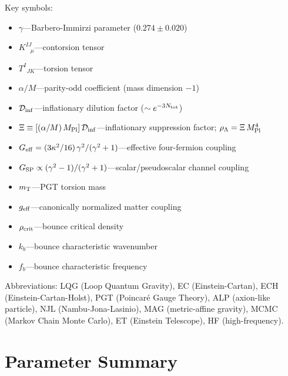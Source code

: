 \documentclass[aps,prd,twocolumn,superscriptaddress,showpacs,preprintnumbers,
  nofootinbib,longbibliography,floatfix]{revtex4-2}
\newcommand{\Dinf}{\mathcal{D}_{\rm inf}}
\newcommand{\rhocrit}{\rho_{\rm crit}}
\newcommand{\MPl}{M_{\rm Pl}}
\newcommand{\BI}{\gamma}
\newcommand{\Geff}{G_{\rm eff}}
\newcommand{\Gsp}{G_{\rm SP}}
\newcommand{\mT}{m_{\rm T}}
\newcommand{\geff}{g_{\rm eff}}
\begin{document}
Key symbols:
\begin{itemize}[leftmargin=*]
\item $\BI$---Barbero-Immirzi parameter ($0.274 \pm 0.020$)
\item $K^{IJ}_{\;\;\;\mu}$---contorsion tensor
\item $T^I_{\;\;JK}$---torsion tensor
\item $\alpha/M$---parity-odd coefficient (mass dimension $-1$)
\item $\Dinf$---inflationary dilution factor ($\sim e^{-3N_{\rm tot}}$)
\item $\Xi\equiv[(\alpha/M)\,\MPl]\,\Dinf$---inflationary suppression
  factor; $\rho_\Lambda = \Xi\,\MPl^4$
\item $\Geff = (3\kappa^2/16)\,\BI^2/(\BI^2+1)$---effective four-fermion
  coupling
\item $\Gsp \propto (\BI^2-1)/(\BI^2+1)$---scalar/pseudoscalar channel
  coupling
\item $\mT$---PGT torsion mass
\item $\geff$---canonically normalized matter coupling
\item $\rhocrit$---bounce critical density
\item $k_b$---bounce characteristic wavenumber
\item $f_b$---bounce characteristic frequency
\end{itemize}

Abbreviations: LQG (Loop Quantum Gravity), EC (Einstein-Cartan),
ECH (Einstein-Cartan-Holst), PGT (Poincar\'e Gauge Theory),
ALP (axion-like particle), NJL (Nambu-Jona-Lasinio), MAG
(metric-affine gravity), MCMC (Markov Chain Monte Carlo), ET (Einstein
Telescope), HF (high-frequency).


\section{Parameter Summary}\label{app:params}
\end{document}
